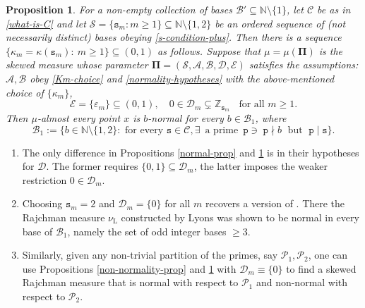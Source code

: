 \documentclass[12pt, twoside]{article}
\newtheorem{proposition}[theorem]{Proposition}
\theoremstyle{definition}
\numberwithin{equation}{section}
\begin{document}
\begin{proposition} \label{normality-special-prop}
For a non-empty collection of bases $\mathscr{B}' \subseteq \mathbb N \setminus \{1\}$, let $\mathscr{C}$ be as in \eqref{what-is-C} and let $\mathcal S = \{\mathtt s_m : m \geq 1\} \subseteq \mathbb N \setminus \{1,2\}$ be an ordered sequence of (not necessarily distinct) bases obeying \eqref{s-condition-plus}. Then there is a sequence $\{\kappa_m=\kappa(\mathtt s_m):\ m\geq 1\} \subseteq (0,1)$ as follows.   
\vskip0.1in 
\noindent Suppose that $\mu = \mu(\pmb{\Pi})$ is the skewed measure whose parameter $\pmb{\Pi} = (\mathcal S, \mathcal A, \mathcal B, \mathcal D, \mathcal E)$ satisfies the assumptions: $\mathcal A, \mathcal B$ obey \eqref{Km-choice} and \eqref{normality-hypotheses} with the above-mentioned choice of $\{\kappa_m\}$, %
\begin{equation*} 
\mathcal E = \{\varepsilon_m \} \subseteq (0, 1), \quad  0 \in \mathscr{D}_m \subsetneq \mathbb Z_{\mathtt s_m} \; \; \text{ for all } m \geq 1.
\end{equation*} 
Then $\mu$-almost every point $x$ is $b$-normal for every $b \in \mathscr{B}_1$, where 
\begin{equation} \label{bases-B1-def}
\mathscr{B}_1 := \bigl\{b \in \mathbb N \setminus \{1,2\} : \text{ for every } \mathtt s \in \mathscr{C}, \exists \,\text{ a prime } \, \mathtt p \ni \;  \mathtt p \nmid b \; \text{ but } \; \mathtt p \mid \mathtt s \bigr\}.
\end{equation} 
\end{proposition} 
\begin{enumerate}[1.]
\item The only difference in Propositions \ref{normal-prop} and \ref{normality-special-prop} is in their hypotheses for $\mathcal D$.  The former requires $\{0,1\}\subseteq \mathscr{D}_m$, the latter imposes the weaker restriction $0\in \mathscr{D}_m$.
\item Choosing $\mathtt s_m = 2$ and $\mathscr{D}_m = \{0 \}$ for all $m$ recovers a version of \cite{PZ-1}. There the Rajchman measure $\nu_{\text{L}}$ constructed by Lyons was shown to be normal in every base of $\mathscr{B}_1$, namely the set of odd integer bases $\geq 3$.  
\item Similarly, given any non-trivial partition of the primes, say $\mathcal P_1, \mathcal P_2$, one can use Propositions \ref{non-normality-prop} and \ref{normality-special-prop} with $\mathscr{D}_m \equiv \{0\}$ to find a skewed Rajchman measure that is normal with respect to $\mathcal P_1$ and non-normal with respect to $\mathcal P_2$.  
\end{enumerate} 
\end{document}
